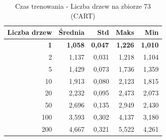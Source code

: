 \begin{table}[htbp]
\centering
\small
\setlength{\tabcolsep}{6pt}
\renewcommand{\arraystretch}{1.2}
\caption{Czas trenowania - Liczba drzew na zbiorze 73 (CART)}
\label{tab:CART_tree_count_73_time}
\begin{tabular}{r|r|r|r|r}
\toprule
Liczba drzew & Średnia & Std & Maks & Min \\
\hline
\textbf{1} & \textbf{1,058} & \textbf{0,047} & \textbf{1,226} & \textbf{1,010} \\
2 & 1,137 & 0,031 & 1,218 & 1,104 \\
5 & 1,429 & 0,073 & 1,736 & 1,359 \\
10 & 1,913 & 0,080 & 2,123 & 1,815 \\
20 & 2,232 & 0,095 & 2,473 & 2,073 \\
50 & 2,696 & 0,135 & 2,949 & 2,430 \\
100 & 3,593 & 0,302 & 4,137 & 3,180 \\
200 & 4,667 & 0,321 & 5,522 & 4,261 \\
\bottomrule
\end{tabular}
\end{table}